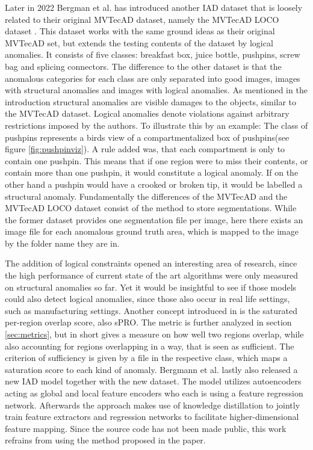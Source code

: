 Later in 2022 Bergman et al. has introduced another IAD dataset that is loosely related to their original MVTecAD dataset, namely the MVTecAD LOCO dataset \cite{LOCODentsAndScratchesBergmann2022}. 
This dataset works with the same ground ideas as their original MVTecAD set, but extends the testing contents of the dataset by logical anomalies. 
It consists of five classes: breakfast box, juice bottle, pushpins, screw bag and splicing connectors. The difference to the other dataset is that the anomalous categories for each class are only separated into good images, images with structural anomalies 
and images with logical anomalies. As mentioned in the introduction structural anomalies are visible damages to the objects, similar to the MVTecAD dataset. Logical anomalies denote violations against arbitrary restrictions 
imposed by the authors. To illustrate this by an example: The class of pushpins represents a birds view of a compartmentalized box of pushpins(see figure \ref{fig:pushpinviz}). A rule added was, 
that each compartment is only to contain one pushpin. This means that if one region were to miss their contents, or contain more than one pushpin, it would constitute a logical anomaly. If on the 
other hand a pushpin would have a crooked or broken tip, it would be  labelled a structural anomaly. Fundamentally the differences of the 
MVTecAD and the MVTecAD LOCO dataset consist of the method to store segmentations. While the former dataset provides one segmentation file per image, here there exists an image 
file for each anomalous ground truth area, which is mapped to the image by the folder name they are in.




The addition of logical constraints opened an interesting area of research, since the high performance 
of current state of the art algorithms were only measured on structural anomalies so far. Yet it would be insightful to see if those models could also detect logical anomalies, since those also occur 
in real life settings, such as manufacturing settings. Another concept introduced in \cite{LOCODentsAndScratchesBergmann2022} is the 
saturated per-region overlap score, also sPRO. The metric is further analyzed in section \ref{sec:metrics}, but in short gives a measure 
on how well two regions overlap, while also accounting for regions overlapping in a way, that is seen as sufficient. The criterion of 
sufficiency is given by a file in the respective class, which maps a saturation score to each kind of anomaly.
Bergmann et al.\cite{LOCODentsAndScratchesBergmann2022} lastly also released a new IAD model together with the new dataset. The model utilizes autoencoders acting 
as global and local feature encoders who each is using a feature regression network. Afterwards the approach makes use of knowledge distillation to jointly train 
feature extractors and regression networks to facilitate higher-dimensional feature mapping. Since the source code has not been made public, 
this work refrains from using the method proposed in the paper.


